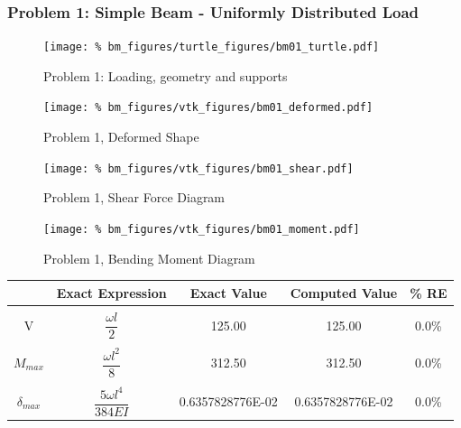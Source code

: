 \subsubsection{Problem 1: Simple Beam - Uniformly Distributed Load}
\begin{figure}[h]
    \texttt{[image: \%
                            bm\_figures/turtle\_figures/bm01\_turtle.pdf]}
    \centering
    \caption{Problem 1: Loading, geometry and supports}
    \label{fig:bm01_turtle}
\end{figure}


\begin{figure}[!htb]
    \texttt{[image: \%
                     bm\_figures/vtk\_figures/bm01\_deformed.pdf]}
    \centering
    \caption{Problem 1, Deformed Shape}
    \label{fig:bm01_deformed}
\end{figure}
\begin{figure}[!htb]
    \texttt{[image: \%
                     bm\_figures/vtk\_figures/bm01\_shear.pdf]}
    \centering
    \caption{Problem 1, Shear Force Diagram}
    \label{fig:bm01_shear}
\end{figure}
\begin{figure}[!htb]
    \texttt{[image: \%
                     bm\_figures/vtk\_figures/bm01\_moment.pdf]}
    \centering
    \caption{Problem 1, Bending Moment Diagram}
    \label{fig:bm01_moment}
\end{figure}
\begin{table}[h!]
\centering
\begin{tabular}{ c| c c c c }
    & Exact Expression & Exact Value & Computed Value & \% RE \\ \hline \\
    V   & $\dfrac{\omega l}{2}$ &  125.00 & 125.00 & 0.0\% \\ \\
    $M_{max}$ & $\dfrac{\omega l^2}{8}$ &  312.50 & 312.50 & 0.0\% \\ \\
    $\delta_{max}$ & $\dfrac{5 \omega l^4}{384EI}$ & 0.6357828776E-02 & 0.6357828776E-02 & 0.0\% \\
\end{tabular}
\end{table}

%
%

\clearpage
